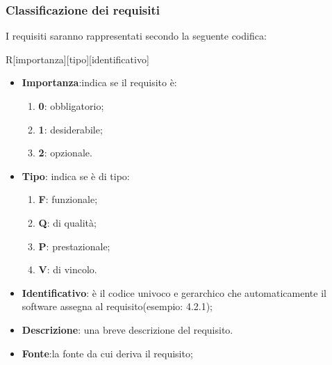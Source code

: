 		\subsubsection{Classificazione  dei requisiti}
		I requisiti saranno rappresentati secondo la seguente codifica:
		\begin{center}
			R[importanza][tipo][identificativo]
		\end{center}
		\begin{itemize}
			\item \textbf{Importanza}:indica se il requisito è:
			\begin{enumerate}
				\item \textbf{0}: obbligatorio;
				\item \textbf{1}: desiderabile;
				\item \textbf{2}: opzionale.
			\end{enumerate}
			\item \textbf{Tipo}: indica se è di tipo:
			\begin{enumerate}
				\item \textbf{F}: funzionale;
				\item \textbf{Q}: di qualità;
				\item \textbf{P}: prestazionale;
				\item \textbf{V}: di vincolo.
			\end{enumerate}
			\item \textbf{Identificativo}: è il codice univoco e gerarchico che automaticamente il software assegna al requisito(esempio: 4.2.1);
			\item \textbf{Descrizione}: una breve descrizione del requisito.
			\item \textbf{Fonte}:la fonte da cui deriva il requisito;
		\end{itemize}
